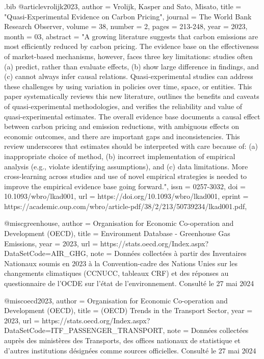 \begin{filecontents}{.bib}
@article{vrolijk2023,
    author = {{Vrolijk, Kasper and Sato, Misato}},
    title = "{Quasi-Experimental Evidence on Carbon Pricing}",
    journal = {The World Bank Research Observer},
    volume = {38},
    number = {2},
    pages = {213-248},
    year = {2023},
    month = {03},
    abstract = "{A growing literature suggests that carbon emissions are most efficiently reduced by carbon pricing. The evidence base on the effectiveness of market-based mechanisms, however, faces three key limitations: studies often (a) predict, rather than evaluate effects, (b) show large difference in findings, and (c) cannot always infer causal relations. Quasi-experimental studies can address these challenges by using variation in policies over time, space, or entities. This paper systematically reviews this new literature, outlines the benefits and caveats of quasi-experimental methodologies, and verifies the reliability and value of quasi-experimental estimates. The overall evidence base documents a causal effect between carbon pricing and emission reductions, with ambiguous effects on economic outcomes, and there are important gaps and inconsistencies. This review underscores that estimates should be interpreted with care because of: (a) inappropriate choice of method, (b) incorrect implementation of empirical analysis (e.g., violate identifying assumptions), and (c) data limitations. More cross-learning across studies and use of novel empirical strategies is needed to improve the empirical evidence base going forward.}",
    issn = {0257-3032},
    doi = {10.1093/wbro/lkad001},
    url = {https://doi.org/10.1093/wbro/lkad001},
    eprint = {https://academic.oup.com/wbro/article-pdf/38/2/213/50739234/lkad001.pdf},
}

@misc{greenhouse,
  author = {{Organisation for Economic Co-operation and Development (OECD)}},
  title = {Environment Database - Greenhouse Gas Emissions},
  year = {2023},
  url = {https://stats.oecd.org/Index.aspx?DataSetCode=AIR_GHG},
  note = {Données collectées à partir des Inventaires Nationaux soumis en 2023 à la Convention-cadre des Nations Unies sur les changements climatiques (CCNUCC, tableaux CRF) et des réponses au questionnaire de l'OCDE sur l'état de l'environnement. Consulté le 27 mai 2024}
}


@misc{oecd2023,
  author = {{Organisation for Economic Co-operation and Development (OECD)}},
  title = {(OECD) Trends in the Transport Sector},
  year = {2023},
  url = {https://stats.oecd.org/Index.aspx?DataSetCode=ITF_PASSENGER_TRANSPORT},
  note = {Données collectées auprès des ministères des Transports, des offices nationaux de statistique et d'autres institutions désignées comme sources officielles. Consulté le 27 mai 2024}
}


\end{filecontents}
